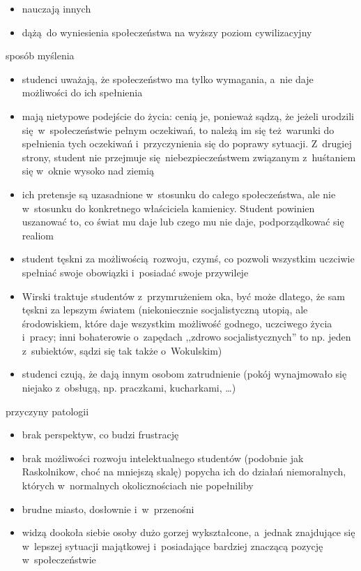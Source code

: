 \begin{description}
\begin{itemize}
\begin{itemize}
                    \item nauczają innych
                    \item dążą do wyniesienia społeczeństwa na wyższy poziom cywilizacyjny
                \end{itemize}
        \end{itemize}
    \item sposób myślenia
        \begin{itemize}
            \item studenci uważają, że społeczeństwo ma tylko wymagania, a~nie daje możliwości do ich spełnienia
            \item mają nietypowe podejście do życia: cenią je, ponieważ sądzą, że jeżeli urodzili się w~społeczeństwie pełnym oczekiwań, to należą im się też warunki do spełnienia tych oczekiwań i~przyczynienia się do poprawy sytuacji. Z~drugiej strony, student nie przejmuje się niebezpieczeństwem związanym z~huśtaniem się w~oknie wysoko nad ziemią
            \item ich pretensje są uzasadnione w~stosunku do całego społeczeństwa, ale nie w~stosunku do konkretnego właściciela kamienicy. Student powinien uszanować to, co świat mu daje lub czego mu nie daje, podporządkować się realiom
            \item student tęskni za możliwością rozwoju, czymś, co pozwoli wszystkim uczciwie spełniać swoje obowiązki i~posiadać swoje przywileje
            \item Wirski traktuje studentów z~przymrużeniem oka, być może dlatego, że sam tęskni za lepszym światem (niekoniecznie socjalistyczną utopią, ale środowiskiem, które daje wszystkim możliwość godnego, uczciwego życia i~pracy; inni bohaterowie o~zapędach ,,zdrowo socjalistycznych'' to np. jeden z~subiektów, sądzi się tak także o~Wokulskim)
            \item studenci czują, że dają innym osobom zatrudnienie (pokój wynajmowało się niejako z~obsługą, np. praczkami, kucharkami, \ldots)
        \end{itemize}
    \item przyczyny patologii
        \begin{itemize}
            \item brak perspektyw, co budzi frustrację
            \item brak możliwości rozwoju intelektualnego studentów (podobnie jak Raskolnikow, choć na mniejszą skalę) popycha ich do działań niemoralnych, których w~normalnych okolicznościach nie popełniliby
            \item brudne miasto, dosłownie i~w~przenośni
            \item widzą dookoła siebie osoby dużo gorzej wykształcone, a~jednak znajdujące się w~lepszej sytuacji majątkowej i~posiadające bardziej znaczącą pozycję w~społeczeństwie
        \end{itemize}
\end{description}